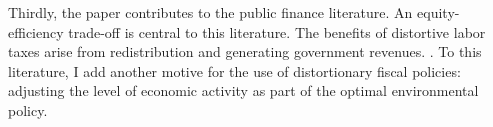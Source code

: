 Thirdly, the paper contributes to the public finance literature.
An equity-efficiency trade-off is central to this literature.  The benefits of distortive labor taxes arise from redistribution and generating government revenues. 
\citep{Heathcote2017OptimalFramework, Conesa2009TaxingAll, Domeij2004OnTaxes}.
To this literature, I add another motive for the use of distortionary fiscal policies: adjusting the level of economic activity as part of the optimal environmental policy. 

\begin{comment}

Finally, the paper relates from its motivation and finding to the discussion on whether production levels are inefficiently high. 
Other motives for the reduction of consumption arise from
envy \cite{Alvarez-Cuadrado2007EnvyHours}, or a positive externality of leisure \cite{Alesina2005WorkDifferent}. \cite{Arrow2004AreMuch} discuss whether there is a need to reduce consumption levels due to sustainability concerns. 
The present paper contributes to this literature by identifying another reason for too high labor supply. The externality results from mitigating an environmental externality and the absence of research subsidies.
\end{comment}